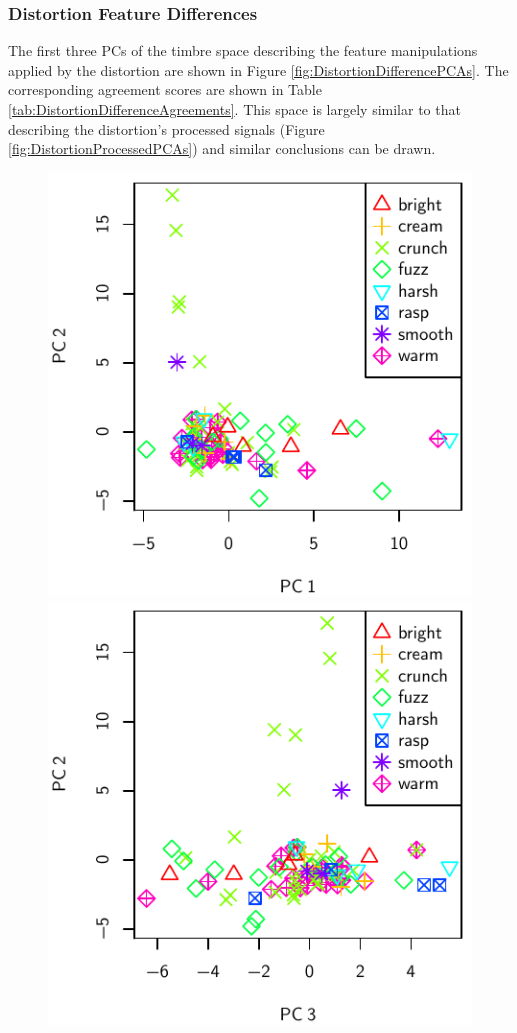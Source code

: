 		\subsubsection*{Distortion Feature Differences}
			The first three PCs of the timbre space describing the feature manipulations applied by the
			distortion are shown in Figure \ref{fig:DistortionDifferencePCAs}. The corresponding agreement
			scores are shown in Table \ref{tab:DistortionDifferenceAgreements}. This space is largely similar
			to that describing the distortion's processed signals (Figure \ref{fig:DistortionProcessedPCAs})
			and similar conclusions can be drawn.

			\begin{figure}[h!]
				\centering
				\subfloat
				{
					\includegraphics{chapter4/Images/DistortionDifferencePCA1-2.pdf}
					\label{fig:DistortionDifferencePCA1-2}
				}
				\quad
				\subfloat
				{
					\includegraphics{chapter4/Images/DistortionDifferencePCA3-2.pdf}
}
\end{figure}
